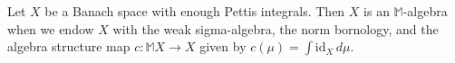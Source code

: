 Let $X$ be a Banach space with enough Pettis integrals. Then $X$ is an $\mathbb{M}$-algebra when we endow $X$ with the weak sigma-algebra, the norm bornology, and the algebra structure map $c\colon \mathbb{M}X \to X$ given by $c(\mu) = \int \mathrm{id}_X \, d\mu$.
